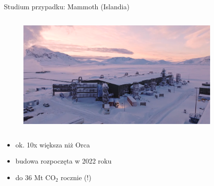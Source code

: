 \begin{columnframe}{Studium przypadku: Mammoth (Islandia)}
    \begin{column}{0.5\textwidth}
        \begin{figure}
            \centering
            \includegraphics[width=0.9\textwidth, frame]{images/mammoth_iceland.png}
        \end{figure}
    \end{column}
    \begin{column}{0.5\textwidth}
        \begin{itemize}
            \item ok. 10x większa niż Orca
            \item budowa rozpoczęta w 2022 roku
            \item do 36 Mt CO$_2$ rocznie (!)
        \end{itemize}
    \end{column}
\end{columnframe}

